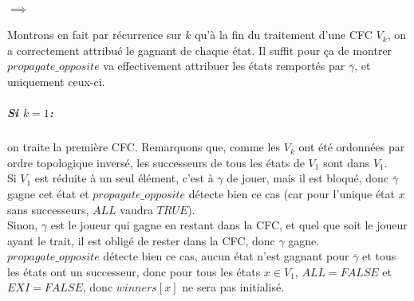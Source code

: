 \documentclass[10pt,a4paper]{article}
\begin{document}
\paragraph{$\implies$}
Montrons en fait par récurrence sur $k$ qu'à la fin du traitement d'une CFC $V_k$, on a correctement attribué le gagnant de chaque état. Il suffit pour ça de montrer $propagate\_opposite$ va effectivement attribuer les états remportés par $\overline{\gamma}$, et uniquement ceux-ci.
\subparagraph{Si $k = 1$:} on traite la première CFC. Remarquons que, comme les $V_k$ ont été ordonnées par ordre topologique inversé, les successeurs de tous les états de $V_1$  sont dans $V_1$.\\
Si $V_1$ est réduite à un seul élément, c'est à $\gamma$ de jouer, mais il est bloqué, donc $\overline{\gamma}$ gagne cet état et $propagate\_opposite$ détecte bien ce cas (car pour l'unique état $x$ sans successeurs, $ALL$ vaudra $TRUE$).\\
Sinon, $\gamma$ est le joueur qui gagne en restant dans la CFC, et quel que soit le joueur ayant le trait, il est obligé de rester dans la CFC, donc $\gamma$ gagne. $propagate\_opposite$ détecte bien ce cas, aucun état n'est gagnant pour $\overline{\gamma}$ et tous les états ont un successeur, donc pour tous les états $x \in V_1$, $ALL = FALSE$ et $EXI = FALSE$, donc $winners[x]$ ne sera pas initialisé.
\end{document}

